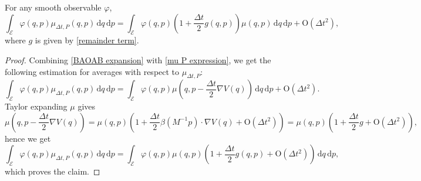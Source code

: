 \begin{corollary}\label{corr2 baoa expansion}
  For any smooth observable $\varphi$,
  \begin{equation}
    \label{corr2 ccl}
    \int_{\mathcal E}\varphi(q,p)\mu_{\Delta t,P}(q,p)\,\mathrm{d}q\, \mathrm{d}p=\int_{\mathcal E}\varphi(q,p)\left(1+\frac{\Delta t}2g(q,p)\right)\mu(q,p)\,\mathrm{d}q\,\mathrm{d}p +\mathrm{O}(\Delta t^2),
    \end{equation}
where $g$ is given by \eqref{remainder term}.
\end{corollary}
\begin{proof}
  Combining \eqref{BAOAB expansion} with \eqref{mu P expression}, we get the following estimation for averages with respect to $\mu_{\Delta t,P}$:
  \begin{equation}
    \label{}
   \int_{\mathcal E}\varphi(q,p)\mu_{\Delta t,P}(q,p)\,\mathrm{d}q\, \mathrm{d}p= \int_{\mathcal E}\varphi(q,p)\mu\left(q,p-\frac{\Delta t}2\nabla V(q)\right)\,\mathrm{d}q\, \mathrm{d}p+ \mathrm{O}(\Delta t^2).
  \end{equation}
  Taylor expanding $\mu$ gives
$$\mu\left(q,p-\frac{\Delta t}2\nabla V(q)\right)=\mu(q,p)\left(1+\frac{\Delta t}2\beta(M^{-1}p)\cdot \nabla V(q) +\mathrm{O}(\Delta t^2)\right)=\mu(q,p)\left(1+\frac{\Delta t}2g+\mathrm{O}(\Delta t^2)\right),$$
hence we get 
\begin{equation}
\label{BAOA first order}
\int_{\mathcal E}\varphi(q,p)\mu_{\Delta t,P}(q,p)\,\mathrm{d}q\, \mathrm{d}p=\int_{\mathcal E}\varphi(q,p)\mu(q,p)\left(1+\frac{\Delta t}2g(q,p)+\mathrm{O}(\Delta t^2)\right)\,\mathrm{d}q\, \mathrm{d}p,
\end{equation}
which proves the claim.
\end{proof}


